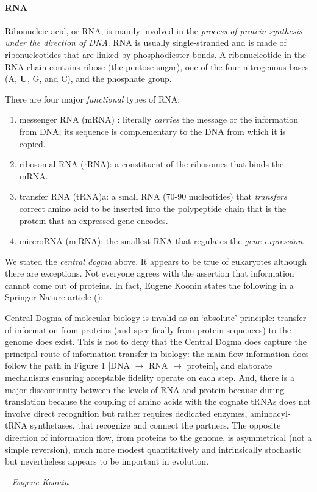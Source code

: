 \documentclass[12pt]{article}
\begin{document}
\paragraph{RNA}
Ribonucleic acid, or RNA, is mainly involved in the \emph{process of protein synthesis under the direction of DNA}. RNA is usually single-stranded and is made of ribonucleotides that are linked by phosphodiester bonds. A ribonucleotide in the RNA chain contains ribose (the pentose sugar), one of the four nitrogenous bases (A, \textbf{U}, G, and C), and the phosphate group.

There are four major \emph{functional} types of RNA:
\begin{enumerate}
    \item messenger RNA (mRNA) : literally \emph{carries} the message or the information from DNA; its sequence is complementary to the DNA from which it is copied.
    \item ribosomal RNA (rRNA): a constituent of the ribosomes that binds the mRNA. 
    \item transfer RNA (tRNA)a: a small RNA (70-90 nucleotides) that \emph{transfers} correct amino acid to be inserted into the polypeptide chain that is the protein that an expressed gene encodes. 
    \item mircroRNA (miRNA): the smallest RNA that regulates the \emph{gene expression}.
\end{enumerate}

We stated the \hyperref[para: central-dogma]{\emph{central dogma}} above. It appears to be true of eukaryotes although there are exceptions. Not everyone agrees with the assertion that information cannot come out of proteins. In fact, Eugene Koonin states the following in a Springer Nature article (\cite{koonin}):
\epigraph{
    Central Dogma of molecular biology is invalid as an `absolute' principle: transfer of information from proteins (and specifically from protein sequences) to the genome does exist. This is not to deny that the Central Dogma does capture the principal route of information transfer in biology: the main flow information does follow the path in Figure 1 [DNA $\rightarrow$ RNA $\rightarrow$ protein], and elaborate mechanisms ensuring acceptable fidelity operate on each step. And, there is a major discontinuity between the levels of RNA and protein because during translation because the coupling of amino acids with the cognate tRNAs does not involve direct recognition but rather requires dedicated enzymes, aminoacyl-tRNA synthetases, that recognize and connect the partners. The opposite direction of information flow, from proteins to the genome, is asymmetrical (not a simple reversion), much more modest quantitatively and intrinsically stochastic but nevertheless appears to be important in evolution.
}
{
    -- \textit{Eugene Koonin} \cite{koonin}}
\end{document}

